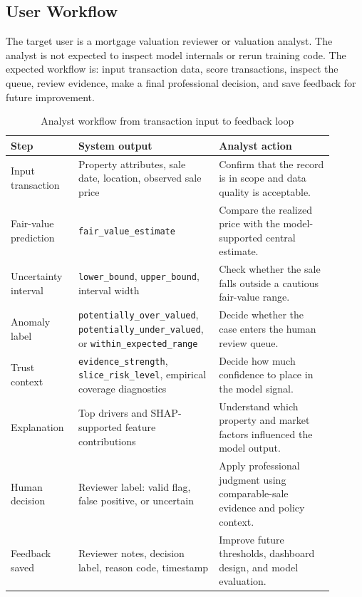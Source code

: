 \documentclass[12pt,a4paper]{article}
\begin{document}
\subsection{User Workflow}
The target user is a mortgage valuation reviewer or valuation analyst. The analyst is not expected to inspect model internals or rerun training code. The expected workflow is: input transaction data, score transactions, inspect the queue, review evidence, make a final professional decision, and save feedback for future improvement.

\begin{table}[H]
\centering
\caption{Analyst workflow from transaction input to feedback loop}
\label{tab:user_workflow}
\begin{tabular}{p{0.20\linewidth}p{0.36\linewidth}p{0.34\linewidth}}
\toprule
\textbf{Step} & \textbf{System output} & \textbf{Analyst action}\\
\midrule
Input transaction & Property attributes, sale date, location, observed sale price & Confirm that the record is in scope and data quality is acceptable.\\
Fair-value prediction & \texttt{fair\_value\_estimate} & Compare the realized price with the model-supported central estimate.\\
Uncertainty interval & \texttt{lower\_bound}, \texttt{upper\_bound}, interval width & Check whether the sale falls outside a cautious fair-value range.\\
Anomaly label & \texttt{potentially\_over\_valued}, \texttt{potentially\_under\_valued}, or \texttt{within\_expected\_range} & Decide whether the case enters the human review queue.\\
Trust context & \texttt{evidence\_strength}, \texttt{slice\_risk\_level}, empirical coverage diagnostics & Decide how much confidence to place in the model signal.\\
Explanation & Top drivers and SHAP-supported feature contributions & Understand which property and market factors influenced the model output.\\
Human decision & Reviewer label: valid flag, false positive, or uncertain & Apply professional judgment using comparable-sale evidence and policy context.\\
Feedback saved & Reviewer notes, decision label, reason code, timestamp & Improve future thresholds, dashboard design, and model evaluation.\\
\bottomrule
\end{tabular}
\end{table}
\end{document}
